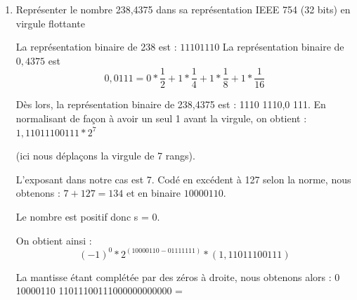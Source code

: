 \documentclass[a4paper,11pt]{article}
\begin{document}
\begin{enumerate}
\item{Représenter le nombre 238,4375 dans sa représentation IEEE 754 (32 bits) en virgule flottante}

La représentation binaire de 238 est : $1110 1110$
La représentation binaire de $0,4375$ est $$0,0111 = 0*\frac{1}{2} + 1*\frac{1}{4} + 1*\frac{1}{8}+ 1*\frac{1}{16}$$

Dès lors, la représentation binaire de 238,4375 est : 1110 1110,0 111.
En normalisant de façon à avoir un seul 1 avant la virgule, on obtient :
$1, 110 1110 0111 * 2^7$

(ici nous déplaçons la virgule de 7 rangs).

L'exposant dans notre cas est 7. Codé en excédent à 127 selon la norme, nous obtenons :
$7 + 127 = 134$ et en binaire $10000110$.

Le nombre est positif donc s = 0.

On obtient ainsi :
$$ (-1)^0*2^{(10000110 - 0111 1111)} * (1,110 1110 0111)$$

La mantisse étant complétée par des zéros à droite, nous obtenons alors : 0 10000110 11011100111000000000000 = 
\end{enumerate}
\end{document}
